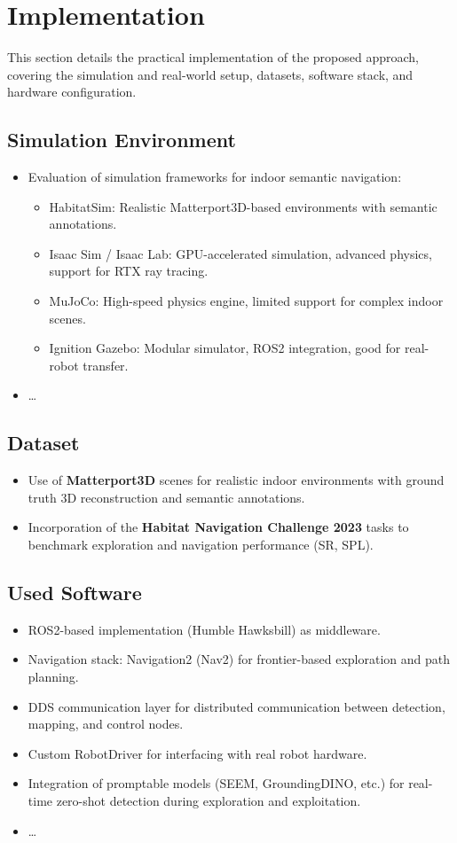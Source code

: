 \chapter{Implementation}
This section details the practical implementation of the proposed approach, covering the simulation and real-world setup, datasets, software stack, and hardware configuration.

\section{Simulation Environment}
\begin{itemize}
    \item Evaluation of simulation frameworks for indoor semantic navigation:
    \begin{itemize}
        \item HabitatSim: Realistic Matterport3D-based environments with semantic annotations.
        \item Isaac Sim / Isaac Lab: GPU-accelerated simulation, advanced physics, support for RTX ray tracing.
        \item MuJoCo: High-speed physics engine, limited support for complex indoor scenes.
        \item Ignition Gazebo: Modular simulator, ROS2 integration, good for real-robot transfer.
    \end{itemize}
    \item \dots
\end{itemize}

\section{Dataset}
\begin{itemize}
    \item Use of \textbf{Matterport3D} scenes for realistic indoor environments with ground truth 3D reconstruction and semantic annotations.
    \item Incorporation of the \textbf{Habitat Navigation Challenge 2023} tasks to benchmark exploration and navigation performance (SR, SPL).
\end{itemize}

\section{Used Software}
\begin{itemize}
    \item ROS2-based implementation (Humble Hawksbill) as middleware.
    \item Navigation stack: Navigation2 (Nav2) for frontier-based exploration and path planning.
    \item DDS communication layer for distributed communication between detection, mapping, and control nodes.
    \item Custom RobotDriver for interfacing with real robot hardware.
    \item Integration of promptable models (SEEM, GroundingDINO, etc.) for real-time zero-shot detection during exploration and exploitation.
    \item \dots
\end{itemize}

